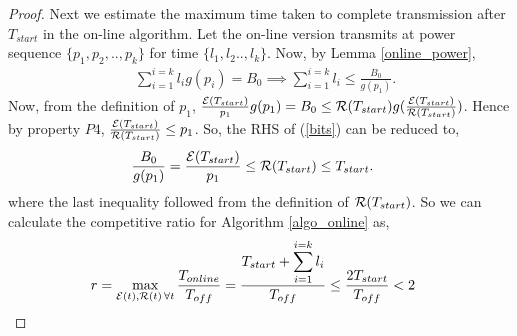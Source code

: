 \begin{proof}
%

Next we estimate the maximum time taken to complete transmission after $T_{start}$ in the on-line algorithm. Let the on-line version transmits at power sequence $\{p_1,p_2,..,p_k\}$ for time $\{l_1,l_2..,l_k\} $. Now, by Lemma \ref{online_power},
\begin{align}
&\sum_{i=1}^{i=k}l_ig(p_i)=B_0\implies\sum_{i=1}^{i=k}l_i\le \frac{B_0}{g(p_1)}.\label{bits}
\end{align}
Now, from the definition of $p_1$, $\frac{\mathcal{E}(T_{start})}{p_1}g(p_1)=B_0 \le \mathcal{R}(T_{start}) g(\frac{\mathcal{E}(T_{start})}{\mathcal{R}(T_{start})})$. Hence by property $P4$, $\frac{\mathcal{E}(T_{start})}{\mathcal{R}(T_{start})}\le p_1$. So, the RHS of (\ref{bits}) can be reduced to, 
\begin{align}
&\frac{B_0}{g(p_1)} = \frac{\mathcal{E}(T_{start})}{p_1} \le \mathcal{R}(T_{start})\le T_{start}.
\end{align}
where the last inequality followed from the definition of $\mathcal{R}(T_{start})$. So we can calculate the competitive ratio for Algorithm \ref{algo_online} as,
\begin{align*}
&r=\displaystyle\max_{\mathcal{E}(t),\mathcal{R}(t)\hspace{0.5mm} \forall t}\dfrac{T_{online}}{T_{off}} = \dfrac{T_{start}+\displaystyle\sum_{i=1}^{i=k}l_i}{T_{off}} \le \dfrac{2 T_{start}}{T_{off}} < 2
\end{align*}
\end{proof}
